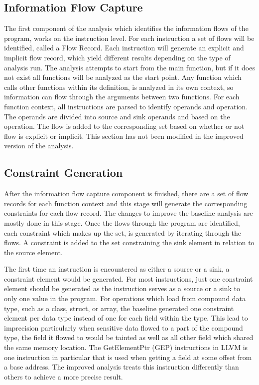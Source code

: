 \documentclass[11pt,a4paper]{article}
\begin{document}
\subsection{Information Flow Capture}

The first component of the analysis which identifies the information flows of
the program, works on the instruction level. For each instruction a set of flows
will be identified, called a Flow Record. Each instruction will generate an
explicit and implicit flow record, which yield different results depending on
the type of analysis run. The analysis attempts to start from the main function,
but if it does not exist all functions will be analyzed as the start point. Any
function which calls other functions within its definition, is analyzed in its
own context, so information can flow through the arguments between two
functions. For each function context, all instructions are parsed to identify
operands and operation. The operands are divided into source and sink operands
and based on the operation. The flow is added to the corresponding set based on
whether or not flow is explicit or implicit. This section has not been modified
in the improved version of the analysis.

\subsection{Constraint Generation}

After the information flow capture component is finished, there are a set of
flow records for each function context and this stage will generate the
corresponding constraints for each flow record. The changes to improve the
baseline analysis are mostly done in this stage. Once the flows through the
program are identified, each constraint which makes up the set, is generated by
iterating through the flows. A constraint is added to the set constraining the
sink element in relation to the source element.

The first time an instruction is encountered as either a source or a sink, a
constraint element would be generated. For most instructions, just one
constraint element should be generated as the instruction serves as a source or
a sink to only one value in the program. For operations which load from compound
data type, such as a class, struct, or array, the baseline generated one
constraint element per data type instead of one for each field within the type.
This lead to imprecision particularly when sensitive data flowed to a part of
the compound type, the field it flowed to would be tainted as well as all other
field which shared the same memory location. The GetElementPtr (GEP)
instructions in LLVM is one instruction in particular that is used when getting
a field at some offset from a base address. The improved analysis treats this
instruction differently than others to achieve a more precise result.
\end{document}
